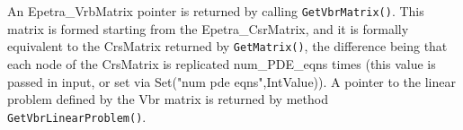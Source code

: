 An Epetra\_VrbMatrix pointer is returned by calling
\verb!GetVbrMatrix()!.  This matrix is formed starting from the
Epetra\_CsrMatrix, and it is formally equivalent to the CrsMatrix
returned by \verb!GetMatrix()!, the difference being that each node of
the CrsMatrix is replicated num\_PDE\_eqns times (this value is passed in
input, or set via Set("num pde eqns",IntValue)). 
A pointer to the linear problem defined by the Vbr matrix is returned by
method \verb!GetVbrLinearProblem()!.

